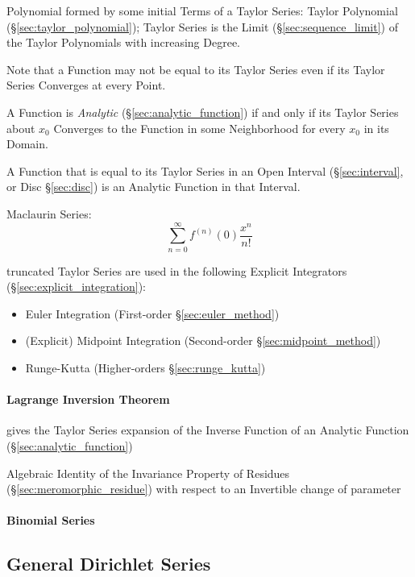 Polynomial formed by some initial Terms of a Taylor Series: Taylor
Polynomial (\S\ref{sec:taylor_polynomial}); Taylor Series is the Limit
(\S\ref{sec:sequence_limit}) of the Taylor Polynomials with increasing
Degree.

Note that a Function may not be equal to its Taylor Series even if its
Taylor Series Converges at every Point.

A Function is \emph{Analytic} (\S\ref{sec:analytic_function}) if and only if
its Taylor Series about $x_0$ Converges to the Function in some Neighborhood
for every $x_0$ in its Domain.

A Function that is equal to its Taylor Series in an Open Interval
(\S\ref{sec:interval}, or Disc \S\ref{sec:disc}) is an Analytic Function in
that Interval.

Maclaurin Series:
\[
  \sum_{n=0}^\infty f^{(n)}(0) \frac{x^n}{n!}
\]

truncated Taylor Series are used in the following Explicit Integrators
(\S\ref{sec:explicit_integration}):
\begin{itemize}
  \item Euler Integration (First-order \S\ref{sec:euler_method})
  \item (Explicit) Midpoint Integration (Second-order
    \S\ref{sec:midpoint_method})
  \item Runge-Kutta (Higher-orders \S\ref{sec:runge_kutta})
\end{itemize}



\paragraph{Lagrange Inversion Theorem}\label{sec:lagrange_inversion}\hfill

gives the Taylor Series expansion of the Inverse Function of an Analytic
Function (\S\ref{sec:analytic_function})

Algebraic Identity of the Invariance Property of Residues
(\S\ref{sec:meromorphic_residue}) with respect to an Invertible change of
parameter



\paragraph{Binomial Series}\label{sec:binomial_series}\hfill


\subsection{General Dirichlet Series}\label{sec:general_dirichlet}

